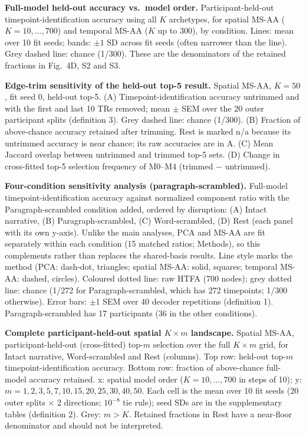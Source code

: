 \caption{\textbf{Full-model held-out accuracy vs.\ model order.}
Participant-held-out timepoint-identification accuracy using all $K$ archetypes, for spatial MS-AA ($K = 10, \ldots, 700$) and temporal MS-AA ($K$ up to 300), by condition. Lines: mean over 10 fit seeds; bands: $\pm 1$ SD across fit seeds (often narrower than the line). Grey dashed line: chance (1/300). These are the denominators of the retained fractions in Fig.~4D, S2 and S3.}
\label{fig:s09}

\caption{\textbf{Edge-trim sensitivity of the held-out top-5 result.}
Spatial MS-AA, $K = 50$, fit seed 0, held-out top-5. (A) Timepoint-identification accuracy untrimmed and with the first and last 10 TRs removed; mean $\pm$ SEM over the 20 outer participant splits (definition 3). Grey dashed line: chance (1/300). (B) Fraction of above-chance accuracy retained after trimming. Rest is marked n/a because its untrimmed accuracy is near chance; its raw accuracies are in A. (C) Mean Jaccard overlap between untrimmed and trimmed top-5 sets. (D) Change in cross-fitted top-5 selection frequency of M0--M4 (trimmed $-$ untrimmed).}
\label{fig:s10}

\caption{\textbf{Four-condition sensitivity analysis (paragraph-scrambled).}
Full-model timepoint-identification accuracy against normalized component ratio with the Paragraph-scrambled condition added, ordered by disruption: (A) Intact narrative, (B) Paragraph-scrambled, (C) Word-scrambled, (D) Rest (each panel with its own y-axis). Unlike the main analyses, PCA and MS-AA are fit separately within each condition (15 matched ratios; Methods), so this complements rather than replaces the shared-basis results. Line style marks the method (PCA: dash-dot, triangles; spatial MS-AA: solid, squares; temporal MS-AA: dashed, circles). Coloured dotted line: raw HTFA (700 nodes); grey dotted line: chance (1/272 for Paragraph-scrambled, which has 272 timepoints; 1/300 otherwise). Error bars: $\pm 1$ SEM over 40 decoder repetitions (definition 1). Paragraph-scrambled has 17 participants (36 in the other conditions).}
\label{fig:s11}

\caption{\textbf{Complete participant-held-out spatial $K \times m$ landscape.}
Spatial MS-AA, participant-held-out (cross-fitted) top-$m$ selection over the full $K \times m$ grid, for Intact narrative, Word-scrambled and Rest (columns). Top row: held-out top-$m$ timepoint-identification accuracy. Bottom row: fraction of above-chance full-model accuracy retained. x: spatial model order ($K = 10, \ldots, 700$ in steps of 10); y: $m = 1, 2, 3, 5, 7, 10, 15, 20, 25, 30, 40, 50$. Each cell is the mean over 10 fit seeds (20 outer splits $\times$ 2 directions; $10^{-8}$ tie rule); seed SDs are in the supplementary tables (definition 2). Grey: $m > K$. Retained fractions in Rest have a near-floor denominator and should not be interpreted.}
\label{fig:s12}

